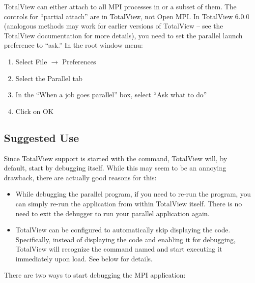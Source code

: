 TotalView can either attach to all MPI processes in
 or a subset of them.  The controls for
``partial attach'' are in TotalView, not Open MPI.  In TotalView 6.0.0
(analogous methods may work for earlier versions of TotalView -- see
the TotalView documentation for more details), you need to set the
parallel launch preference to ``ask.''  In the root window menu:

\begin{enumerate}
\item Select File $\rightarrow$ Preferences
\item Select the Parallel tab
\item In the ``When a job goes parallel'' box, select ``Ask what to do''
\item Click on OK
\end{enumerate}


\subsection{Suggested Use}

Since TotalView support is started with the  command,
TotalView will, by default, start by debugging  itself.
While this may seem to be an annoying drawback, there are actually
good reasons for this:

\begin{itemize}
\item While debugging the parallel program, if you need to re-run the
  program, you can simply re-run the application from within TotalView
  itself.  There is no need to exit the debugger to run your parallel
  application again.
  
\item TotalView can be configured to automatically skip displaying the
   code.  Specifically, instead of displaying the
   code and enabling it for debugging, TotalView will
  recognize the command named  and start executing it
  immediately upon load.  See below for details.
\end{itemize}

\noindent There are two ways to start debugging the MPI application:

